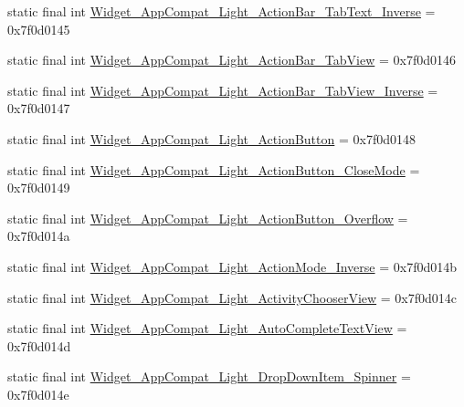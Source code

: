\begin{DoxyCompactItemize}
\item 
static final int \mbox{\hyperlink{classcom_1_1synnapps_1_1carouselview_1_1_r_1_1style_ac2d4429c51986915c335b0a4e591ed97}{Widget\+\_\+\+App\+Compat\+\_\+\+Light\+\_\+\+Action\+Bar\+\_\+\+Tab\+Text\+\_\+\+Inverse}} = 0x7f0d0145
\item 
static final int \mbox{\hyperlink{classcom_1_1synnapps_1_1carouselview_1_1_r_1_1style_a4eb970f3de1f998a825f6d1114256968}{Widget\+\_\+\+App\+Compat\+\_\+\+Light\+\_\+\+Action\+Bar\+\_\+\+Tab\+View}} = 0x7f0d0146
\item 
static final int \mbox{\hyperlink{classcom_1_1synnapps_1_1carouselview_1_1_r_1_1style_a25c7c03d338115edf39d20b0383ab1bc}{Widget\+\_\+\+App\+Compat\+\_\+\+Light\+\_\+\+Action\+Bar\+\_\+\+Tab\+View\+\_\+\+Inverse}} = 0x7f0d0147
\item 
static final int \mbox{\hyperlink{classcom_1_1synnapps_1_1carouselview_1_1_r_1_1style_a31dbfaa42272d25e43a5f958cbfa3b30}{Widget\+\_\+\+App\+Compat\+\_\+\+Light\+\_\+\+Action\+Button}} = 0x7f0d0148
\item 
static final int \mbox{\hyperlink{classcom_1_1synnapps_1_1carouselview_1_1_r_1_1style_a9a983d7db253f7816c4e95d2b06df16e}{Widget\+\_\+\+App\+Compat\+\_\+\+Light\+\_\+\+Action\+Button\+\_\+\+Close\+Mode}} = 0x7f0d0149
\item 
static final int \mbox{\hyperlink{classcom_1_1synnapps_1_1carouselview_1_1_r_1_1style_aaa7349b3619b16d123604581e9ef9764}{Widget\+\_\+\+App\+Compat\+\_\+\+Light\+\_\+\+Action\+Button\+\_\+\+Overflow}} = 0x7f0d014a
\item 
static final int \mbox{\hyperlink{classcom_1_1synnapps_1_1carouselview_1_1_r_1_1style_a06c0c84f63717d970a164278fc7a30ba}{Widget\+\_\+\+App\+Compat\+\_\+\+Light\+\_\+\+Action\+Mode\+\_\+\+Inverse}} = 0x7f0d014b
\item 
static final int \mbox{\hyperlink{classcom_1_1synnapps_1_1carouselview_1_1_r_1_1style_aac5fafa43ba1235637571eee9f3624e9}{Widget\+\_\+\+App\+Compat\+\_\+\+Light\+\_\+\+Activity\+Chooser\+View}} = 0x7f0d014c
\item 
static final int \mbox{\hyperlink{classcom_1_1synnapps_1_1carouselview_1_1_r_1_1style_a3f41a1f82fe815aefdcc8c2f7fc9bed3}{Widget\+\_\+\+App\+Compat\+\_\+\+Light\+\_\+\+Auto\+Complete\+Text\+View}} = 0x7f0d014d
\item 
static final int \mbox{\hyperlink{classcom_1_1synnapps_1_1carouselview_1_1_r_1_1style_afcff72f6dd61d79b972f2480ef41959d}{Widget\+\_\+\+App\+Compat\+\_\+\+Light\+\_\+\+Drop\+Down\+Item\+\_\+\+Spinner}} = 0x7f0d014e
\item 

\end{DoxyCompactItemize}
